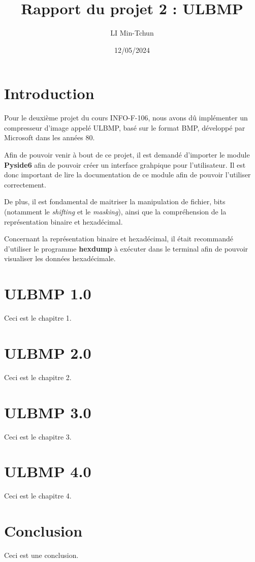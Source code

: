 \documentclass{report}
\title{Rapport du projet 2 : ULBMP}
\author{LI Min-Tchun}
\date{12/05/2024}
\begin{document}
	\maketitle
	\tableofcontents

\chapter{Introduction}
Pour le deuxième projet du cours INFO-F-106, nous avons dû implémenter un compresseur d'image appelé ULBMP, basé sur le format BMP, développé par Microsoft dans les années 80.

Afin de pouvoir venir à bout de ce projet, il est demandé d'importer le module \textbf{Pyside6} afin de pouvoir créer un interface grahpique pour l'utilisateur. Il est donc important de lire la documentation de ce module afin de pouvoir l'utiliser correctement.

De plus, il est fondamental de maitriser la manipulation de fichier, bits (notamment le \textit{shifting} et le \textit{masking}), ainsi que la compréhension de la représentation binaire et hexadécimal.

Concernant la représentation binaire et hexadécimal, il était recommandé d'utiliser le programme \textbf{hexdump} à exécuter dans le terminal afin de pouvoir visualiser les données hexadécimale.
\chapter{ULBMP 1.0}
Ceci est le chapitre 1.

\chapter{ULBMP 2.0}
Ceci est le chapitre 2.

\chapter{ULBMP 3.0}
Ceci est le chapitre 3.

\chapter{ULBMP 4.0}
Ceci est le chapitre 4.

\chapter{Conclusion}
Ceci est une conclusion.
\end{document}
